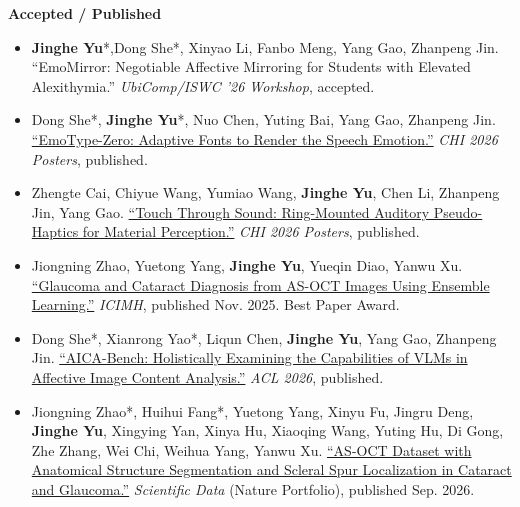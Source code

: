 \documentclass[a4paper,10pt]{extarticle}
\begin{document}
\textbf{Accepted / Published}
\begin{itemize}
    \item \textbf{Jinghe Yu}*,Dong She*, Xinyao Li, Fanbo Meng, Yang Gao, Zhanpeng Jin. {``EmoMirror: Negotiable Affective Mirroring for Students with Elevated Alexithymia.''} \textit{UbiComp/ISWC '26 Workshop}, accepted.
    \item Dong She*, \textbf{Jinghe Yu}*, Nuo Chen, Yuting Bai, Yang Gao, Zhanpeng Jin. \href{https://dl.acm.org/doi/10.1145/3772363.3798656}{``EmoType-Zero: Adaptive Fonts to Render the Speech Emotion.''} \textit{CHI 2026 Posters}, published.
    \item Zhengte Cai, Chiyue Wang, Yumiao Wang, \textbf{Jinghe Yu}, Chen Li, Zhanpeng Jin, Yang Gao. \href{https://dl.acm.org/doi/10.1145/3772363.3798554}{``Touch Through Sound: Ring-Mounted Auditory Pseudo-Haptics for Material Perception.''} \textit{CHI 2026 Posters}, published.
    \item Jiongning Zhao, Yuetong Yang, \textbf{Jinghe Yu}, Yueqin Diao, Yanwu Xu. \href{https://dl.acm.org/doi/10.1145/3784929.3784932}{``Glaucoma and Cataract Diagnosis from AS-OCT Images Using Ensemble Learning.''} \textit{ICIMH}, published Nov. 2025. Best Paper Award.
    \item Dong She*, Xianrong Yao*, Liqun Chen, \textbf{Jinghe Yu}, Yang Gao, Zhanpeng Jin. \href{https://aclanthology.org/2026.findings-acl.661/}{``AICA-Bench: Holistically Examining the Capabilities of VLMs in Affective Image Content Analysis.''} \textit{ACL 2026}, published.
    \item Jiongning Zhao*, Huihui Fang*, Yuetong Yang, Xinyu Fu, Jingru Deng, \textbf{Jinghe Yu}, Xingying Yan, Xinya Hu, Xiaoqing Wang, Yuting Hu, Di Gong, Zhe Zhang, Wei Chi, Weihua Yang, Yanwu Xu. \href{https://www.nature.com/articles/s41597-026-08315-8}{``AS-OCT Dataset with Anatomical Structure Segmentation and Scleral Spur Localization in Cataract and Glaucoma.''} \textit{Scientific Data} (Nature Portfolio), published Sep. 2026.
\end{itemize}
\end{document}

